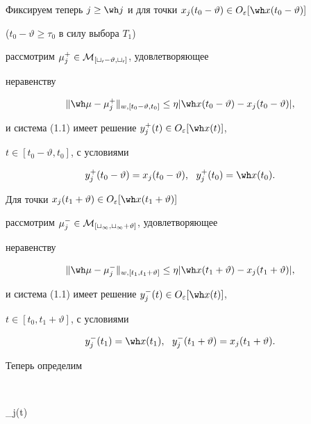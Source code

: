 \begin{pf}
Фиксируем теперь $j\ge\wh j$ и для точки $x_j(t_0-\vartheta)


\in O_\varepsilon[\wh x(t_0-\vartheta)]$


($t_0-\vartheta\ge\tau_0$ в силу выбора $T_1$)


рассмотрим $\mu_{j}^{+}\in\cal M_{[t_0-\vartheta,t_0]}$, удовлетворяющее


неравенству


\begin{equation}


\|\wh\mu-\mu_{j}^+\|_{w,[t_0-\vartheta,t_0]}\le\eta


|\wh x(t_0-\vartheta)-x_j(t_0-\vartheta)|,


\end{equation}


и система (1.1) имеет решение $y_j^+(t)\in O_\varepsilon[\wh x(t)]$,


$t\in[t_0-\vartheta,t_0]$, с условиями


\begin{equation}


y_j^+(t_0-\vartheta)=x_j(t_0-\vartheta),\ \ y_j^+(t_0)=\wh x(t_0).


\end{equation}


Для точки $x_j(t_1+\vartheta)\in O_\varepsilon[\wh x(t_1+\vartheta)]$


рассмотрим $\mu_j^-\in\cal M_{[t_1,t_1+\vartheta]}$, удовлетворяющее


неравенству


\begin{equation}


\|\wh\mu-\mu_j^-\|_{w,[t_1,t_1+\vartheta]}\le\eta


|\wh x(t_1+\vartheta)-x_j(t_1+\vartheta)|,


\end{equation}


и система (1.1) имеет решение $y_j^-(t)\in O_\varepsilon[\wh x(t)]$,


$t\in[t_0,t_1+\vartheta]$, с условиями


\begin{equation}


y_j^-(t_1)=\wh x(t_1),\ \ y_j^-(t_1+\vartheta)=x_j(t_1+\vartheta).


\end{equation}


Теперь определим 


$$


\nu_j(t)\doteq



\end{pf}
